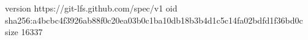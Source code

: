version https://git-lfs.github.com/spec/v1
oid sha256:a4bcbc4f3926ab88f0c20ea03b0c1ba10db18b3b4d1c5c14fa02bdfd1f36bd0c
size 16337
